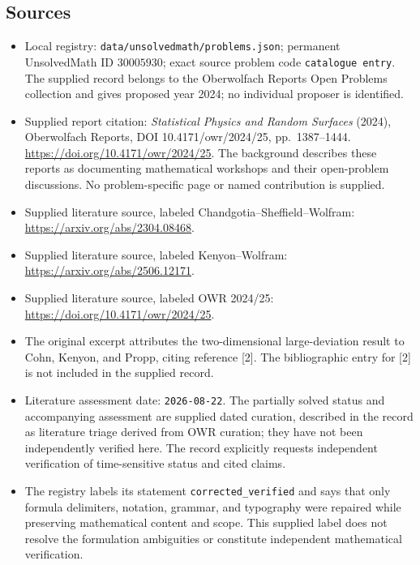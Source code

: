 \documentclass[11pt]{article}
\begin{document}
\subsection{Sources}
\begin{itemize}
\item Local registry: \texttt{data/unsolvedmath/problems.json}; permanent UnsolvedMath ID \(30005930\); exact source problem code \texttt{catalogue entry}. The supplied record belongs to the Oberwolfach Reports Open Problems collection and gives proposed year 2024; no individual proposer is identified.
\item Supplied report citation: \emph{Statistical Physics and Random Surfaces} (2024), Oberwolfach Reports, DOI 10.4171/owr/2024/25, pp.\ 1387--1444. \url{https://doi.org/10.4171/owr/2024/25}. The background describes these reports as documenting mathematical workshops and their open-problem discussions. No problem-specific page or named contribution is supplied.
\item Supplied literature source, labeled Chandgotia--Sheffield--Wolfram: \url{https://arxiv.org/abs/2304.08468}.
\item Supplied literature source, labeled Kenyon--Wolfram: \url{https://arxiv.org/abs/2506.12171}.
\item Supplied literature source, labeled OWR 2024/25: \url{https://doi.org/10.4171/owr/2024/25}.
\item The original excerpt attributes the two-dimensional large-deviation result to Cohn, Kenyon, and Propp, citing reference [2]. The bibliographic entry for [2] is not included in the supplied record.
\item Literature assessment date: \texttt{2026-08-22}. The partially solved status and accompanying assessment are supplied dated curation, described in the record as literature triage derived from OWR curation; they have not been independently verified here. The record explicitly requests independent verification of time-sensitive status and cited claims.
\item The registry labels its statement \texttt{corrected\_verified} and says that only formula delimiters, notation, grammar, and typography were repaired while preserving mathematical content and scope. This supplied label does not resolve the formulation ambiguities or constitute independent mathematical verification.
\end{itemize}
\end{document}
